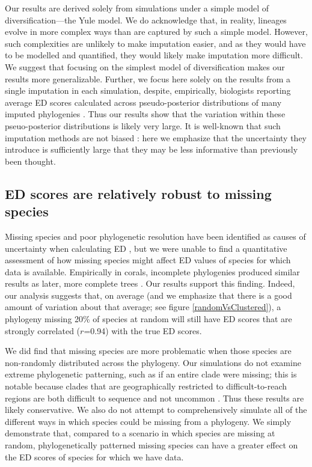 \documentclass[12pt,english]{article}
\begin{document}
Our results are derived solely from simulations under a simple model of
diversification---the Yule model. We do acknowledge that, in reality, lineages
evolve in more complex ways than are captured by such a simple model. However,
such complexities are unlikely to make imputation easier, and as they would
have to be modelled and quantified, they would likely make imputation more difficult.
We suggest that focusing on the simplest
model of diversification makes our results more generalizable. Further, we focus
here solely on the results from a single imputation in each simulation, despite,
empirically, biologists reporting average ED scores calculated across
pseudo-posterior distributions of many imputed phylogenies \autocite{Kuhn2011}.
Thus our results show that the variation within these pseuo-posterior distributions
is likely very large.
It is well-known that such imputation methods are not
biased \autocite[indeed, this was originally shown by][]{Kuhn2011}: here we
emphasize that the uncertainty they introduce is sufficiently large that they
may be less informative than previously been thought.

\subsection*{ED scores are relatively robust to missing species}
Missing species and poor phylogenetic resolution have been identified as causes
of uncertainty when calculating ED \autocite{Isaac2007}, but we were unable to
find a quantitative assessment of how missing species might affect ED values of
species for which data is available. Empirically in corals, incomplete phylogenies
produced similar results as later, more complete trees \autocite{Curnick2015}.
Our results support this finding. Indeed, our analysis suggests that, on average
(and we emphasize that there is a good amount of variation about that average;
see figure \ref{randomVsClustered}), a phylogeny missing 20\% of species at random will
still have ED scores that are strongly correlated ($r$=0.94) with the true ED
scores.

We did find that missing species are more problematic when those species are
non-randomly distributed across the phylogeny. Our simulations do not examine
extreme phylogenetic patterning, such as if an entire clade were missing; this
is notable because clades that are geographically restricted to
difficult-to-reach regions are both difficult to sequence and not uncommon
\autocite[as is seen with 27 coral species in the Indian
Ocean;][]{Arrigoni2012}. Thus these results are likely conservative. We also do
not attempt to comprehensively simulate all of the different ways in which
species could be missing from a phylogeny. We simply demonstrate that, compared
to a scenario in which species are missing at random,
phylogenetically patterned missing species can have a greater effect on the ED
scores of species for which we have data.
\end{document}
